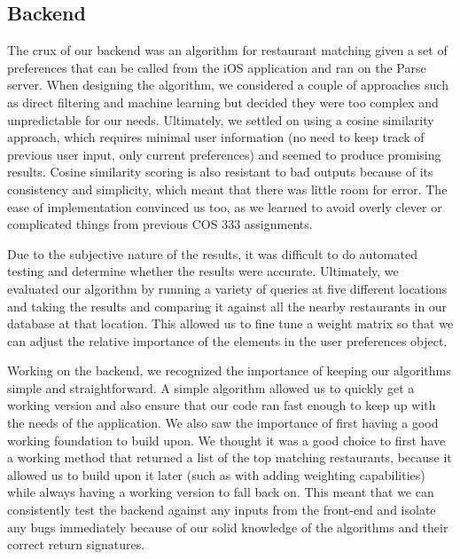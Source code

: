 \documentclass[12pt]{article}
\begin{document}
\subsection{Backend}
The crux of our backend was an algorithm for restaurant matching given a set of preferences that can be called from the iOS application and ran on the Parse server. When designing the algorithm, we considered a couple of approaches such as direct filtering and machine learning but decided they were too complex and unpredictable for our needs. Ultimately, we settled on using a cosine similarity approach, which requires minimal user information (no need to keep track of previous user input, only current preferences) and seemed to produce promising results. Cosine similarity scoring is also resistant to bad outputs because of its consistency and simplicity, which meant that there was little room for error. The ease of implementation convinced us too, as we learned to avoid overly clever or complicated things from previous COS 333 assignments. 

Due to the subjective nature of the results, it was difficult to do automated testing and determine whether the results were accurate. Ultimately, we evaluated our algorithm by running a variety of queries at five different locations and taking the results and comparing it against all the nearby restaurants in our database at that location. This allowed us to fine tune a weight matrix so that we can adjust the relative importance of the elements in the user preferences object.

Working on the backend, we recognized the importance of keeping our algorithms simple and straightforward. A simple algorithm allowed us to quickly get a working version and also ensure that our code ran fast enough to keep up with the needs of the application. We also saw the importance of first having a good working foundation to build upon. We thought it was a good choice to first have a working method that returned a list of the top matching restaurants, because it allowed us to build upon it later (such as with adding weighting capabilities) while always having a working version to fall back on. This meant that we can consistently test the backend against any inputs from the front-end and isolate any bugs immediately because of our solid knowledge of the algorithms and their correct return signatures.
\end{document}

